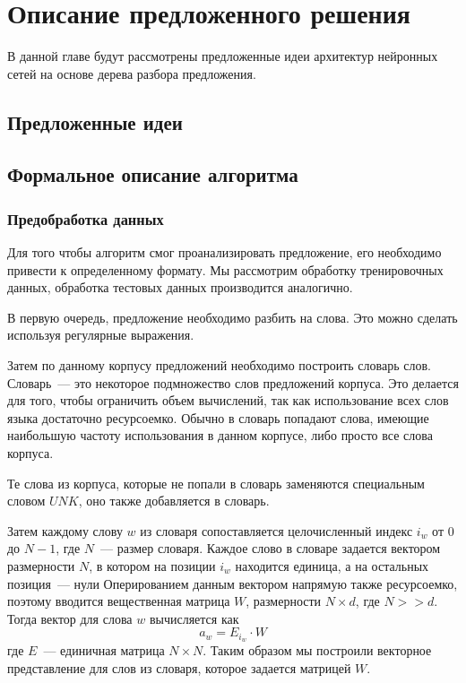 
\chapter{Описание предложенного решения}

В данной главе будут рассмотрены предложенные идеи архитектур нейронных сетей на основе дерева разбора предложения.


\section{Предложенные идеи}

\section{Формальное описание алгоритма}

\subsection{Предобработка данных}
Для того чтобы алгоритм смог проанализировать предложение, 
его необходимо привести к определенному формату. Мы рассмотрим обработку
тренировочных данных, обработка тестовых данных производится аналогично.

В первую очередь, предложение необходимо разбить на слова. 
Это можно сделать используя регулярные выражения. 

Затем по данному корпусу предложений необходимо построить словарь слов.
Словарь~--- это некоторое подмножество слов предложений корпуса.
Это делается для того, чтобы ограничить объем вычислений, так как использование всех
слов языка достаточно ресурсоемко. Обычно в словарь попадают слова, 
имеющие наибольшую частоту использования в данном корпусе, 
либо просто все слова корпуса.

Те слова из корпуса, которые не попали в словарь заменяются специальным словом $UNK$, 
оно также добавляется в словарь.

Затем каждому слову $w$ из словаря сопоставляется целочисленный индекс $i_w$ 
от $0$ до $N-1$, где $N$~--- размер словаря.
Каждое слово в словаре задается вектором размерности $N$, 
в котором на позиции $i_w$ находится единица, а на остальных позиция~--- нули
Оперированием данным вектором напрямую также ресурсоемко, поэтому вводится вещественная матрица $W$, 
размерности $N \times d$, где $N >> d$. Тогда вектор для слова $w$ вычисляется как
$$a_w = E_{i_w} \cdot W$$
где $E$~--- единичная матрица $N \times N$.
Таким образом мы построили векторное представление для слов из словаря, которое задается матрицей $W$.

